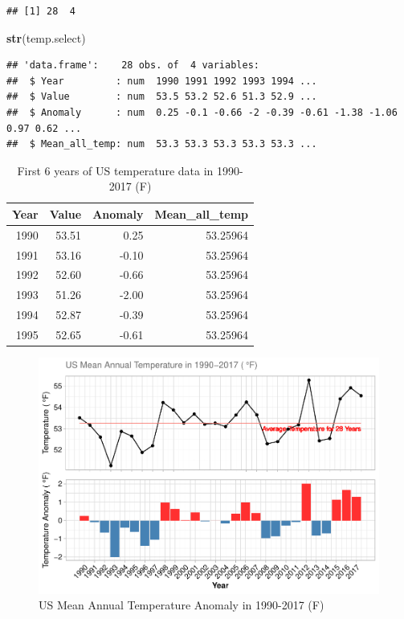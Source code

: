 \documentclass[12pt,]{article}
\newenvironment{Shaded}{\begin{snugshade}}{\end{snugshade}}
\newcommand{\KeywordTok}[1]{\textcolor[rgb]{0.13,0.29,0.53}{\textbf{#1}}}
\newcommand{\NormalTok}[1]{#1}
\begin{document}
\begin{verbatim}
## [1] 28  4
\end{verbatim}

\begin{Shaded}
\begin{Highlighting}[]
\KeywordTok{str}\NormalTok{(temp.select)}
\end{Highlighting}
\end{Shaded}

\begin{verbatim}
## 'data.frame':    28 obs. of  4 variables:
##  $ Year         : num  1990 1991 1992 1993 1994 ...
##  $ Value        : num  53.5 53.2 52.6 51.3 52.9 ...
##  $ Anomaly      : num  0.25 -0.1 -0.66 -2 -0.39 -0.61 -1.38 -1.06 0.97 0.62 ...
##  $ Mean_all_temp: num  53.3 53.3 53.3 53.3 53.3 ...
\end{verbatim}

\begin{table}[!h]

\caption{\label{tab:unnamed-chunk-12}First 6 years of US temperature data in 1990-2017 (F)}
\centering
\begin{tabular}{r|r|r|r}
\hline
Year & Value & Anomaly & Mean\_all\_temp\\
\hline
1990 & 53.51 & 0.25 & 53.25964\\
\hline
1991 & 53.16 & -0.10 & 53.25964\\
\hline
1992 & 52.60 & -0.66 & 53.25964\\
\hline
1993 & 51.26 & -2.00 & 53.25964\\
\hline
1994 & 52.87 & -0.39 & 53.25964\\
\hline
1995 & 52.65 & -0.61 & 53.25964\\
\hline
\end{tabular}
\end{table}

\begin{figure}
\centering
\includegraphics{Project_Code_files/figure-latex/unnamed-chunk-13-1.pdf}
\caption{US Mean Annual Temperature Anomaly in 1990-2017 (F)}
\end{figure}
\end{document}
